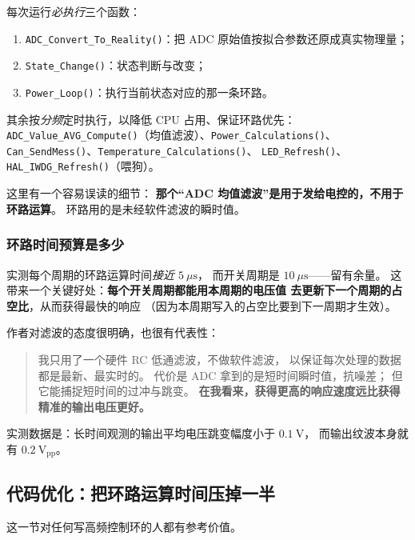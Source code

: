 \documentclass[cn,blue,11pt,device=normal]{elegantnote}
\begin{document}
每次运行\emph{必执行}三个函数：

\begin{enumerate}
  \item \texttt{ADC\_\allowbreak{}Convert\_\allowbreak{}To\_\allowbreak{}Reality()}：把 ADC 原始值按拟合参数还原成真实物理量；
  \item \texttt{State\_\allowbreak{}Change()}：状态判断与改变；
  \item \texttt{Power\_\allowbreak{}Loop()}：执行当前状态对应的那一条环路。
\end{enumerate}

其余按\emph{分频}定时执行，以降低 CPU 占用、保证环路优先：
\texttt{ADC\_\allowbreak{}Value\_\allowbreak{}AVG\_\allowbreak{}Compute()}（均值滤波）、\texttt{Power\_\allowbreak{}Calculations()}、
\texttt{Can\_\allowbreak{}SendMess()}、\texttt{Temperature\_\allowbreak{}Calculations()}、
\texttt{LED\_\allowbreak{}Refresh()}、\texttt{HAL\_\allowbreak{}IWDG\_\allowbreak{}Refresh()}（喂狗）。

这里有一个容易误读的细节：
\textbf{那个“ADC 均值滤波”是用于发给电控的，不用于环路运算}。
环路用的是未经软件滤波的瞬时值。

\subsubsection{环路时间预算是多少}

实测每个周期的环路运算时间\emph{接近 $5\ \mu\mathrm{s}$}，
而开关周期是 $10\ \mu\mathrm{s}$——留有余量。
这带来一个关键好处：\textbf{每个开关周期都能用本周期的电压值
去更新下一个周期的占空比}，从而获得最快的响应
（因为本周期写入的占空比要到下一周期才生效）。

作者对滤波的态度很明确，也很有代表性：

\begin{quote}
我只用了一个硬件 RC 低通滤波，不做软件滤波，
以保证每次处理的数据都是最新、最实时的。
代价是 ADC 拿到的是短时间瞬时值，抗噪差；
但它能捕捉短时间的过冲与跳变。
\textbf{在我看来，获得更高的响应速度远比获得精准的输出电压更好。}
\end{quote}

实测数据是：长时间观测的输出平均电压跳变幅度小于 $0.1\ \mathrm{V}$，
而输出纹波本身就有 $0.2\ \mathrm{V_{pp}}$。

\subsection{代码优化：把环路运算时间压掉一半}

这一节对任何写高频控制环的人都有参考价值。
\end{document}
